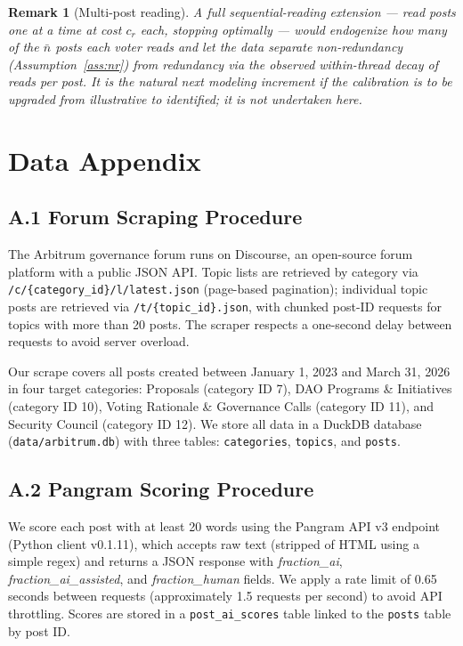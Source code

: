 \documentclass[12pt]{article}
\newtheorem{remark}{Remark}
\begin{document}
\setcounter{figure}{0}
\setcounter{table}{0}
\renewcommand{\thefigure}{A\arabic{figure}}
\renewcommand{\thetable}{A\arabic{table}}

\begin{remark}[Multi-post reading]
\label{app:rem:kpost}
A full sequential-reading extension --- read posts one at a time at cost $c_r$
each, stopping optimally --- would endogenize how many of the $\bar n$ posts
each voter reads and let the data separate non-redundancy
(Assumption~\ref{ass:nr}) from redundancy via the observed within-thread decay
of reads per post. It is the natural next modeling increment if the calibration
is to be upgraded from illustrative to identified; it is not undertaken here.
\end{remark}

\section{Data Appendix}
\label{app:data}



\subsection*{A.1 Forum Scraping Procedure}

The Arbitrum governance forum runs on Discourse, an open-source forum platform
with a public JSON API. Topic lists are retrieved by category via
{\small\texttt{/c/\{category\_id\}/l/latest.json}} (page-based pagination);
individual topic posts are retrieved via {\small\texttt{/t/\{topic\_id\}.json}},
with chunked post-ID requests for topics with more than 20 posts.
The scraper respects a one-second delay between requests to avoid server overload.

Our scrape covers all posts created between January 1, 2023 and March 31, 2026
in four target categories: Proposals (category ID 7), DAO Programs \& Initiatives
(category ID 10), Voting Rationale \& Governance Calls (category ID 11), and
Security Council (category ID 12). We store all data in a DuckDB database
(\texttt{data/arbitrum.db}) with three tables: \texttt{categories},
\texttt{topics}, and \texttt{posts}.

\subsection*{A.2 Pangram Scoring Procedure}

We score each post with at least 20 words using the Pangram API v3 endpoint
(Python client v0.1.11), which accepts raw text (stripped of HTML using a simple
regex) and returns a JSON response with \textit{fraction\_ai},
\textit{fraction\_ai\_assisted}, and \textit{fraction\_human} fields. We apply
a rate limit of 0.65 seconds between requests (approximately 1.5 requests per
second) to avoid API throttling. Scores are stored in a
\texttt{post\_ai\_scores} table linked to the \texttt{posts} table by post ID.
\end{document}
